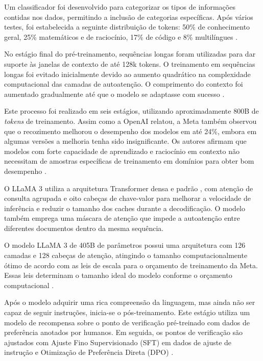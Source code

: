 Um classificador foi desenvolvido para categorizar os tipos de informações contidas nos dados, permitindo a inclusão de categorias específicas. Após vários testes, foi estabelecida a seguinte distribuição de tokens: 50\% de conhecimento geral, 25\% matemáticos e de raciocínio, 17\% de código e 8\% multilíngues \cite{llama3}.

No estágio final do pré-treinamento, sequências longas foram utilizadas para dar suporte às janelas de contexto de até 128k tokens. O treinamento em sequências longas foi evitado inicialmente devido ao aumento quadrático na complexidade computacional das camadas de autoatenção. O comprimento do contexto foi aumentado gradualmente até que o modelo se adaptasse com sucesso \cite{llama3}.

Este processo foi realizado em seis estágios, utilizando aproximadamente 800B de \textit{tokens} de treinamento. Assim como a OpenAI relatou, a Meta também observou que o recozimento melhorou o desempenho dos modelos em até 24\%, embora em algumas versões a melhoria tenha sido insignificante. Os autores afirmam que modelos com forte capacidade de aprendizado e raciocínio em contexto não necessitam de amostras específicas de treinamento em domínios para obter bom desempenho \cite{llama3}.

O LLaMA 3 utiliza a arquitetura Transformer densa e padrão \cite{vaswani2017}, com atenção de consulta agrupada \cite{ainslie2023} e oito cabeças de chave-valor para melhorar a velocidade de inferência e reduzir o tamanho dos caches durante a decodificação. O modelo também emprega uma máscara de atenção que impede a autoatenção entre diferentes documentos dentro da mesma sequência.

O modelo LLaMA 3 de 405B de parâmetros possui uma arquitetura com 126 camadas e 128 cabeças de atenção, atingindo o tamanho computacionalmente ótimo de acordo com as leis de escala para o orçamento de treinamento da Meta. Essas leis determinam o tamanho ideal do modelo conforme o orçamento computacional \cite{llama3}.

Após o modelo adquirir uma rica compreensão da linguagem, mas ainda não ser capaz de seguir instruções, inicia-se o pós-treinamento. Este estágio utiliza um modelo de recompensa sobre o ponto de verificação pré-treinado com dados de preferência anotados por humanos. Em seguida, os pontos de verificação são ajustados com Ajuste Fino Supervisionado (SFT) em dados de ajuste de instrução e Otimização de Preferência Direta (DPO) \cite{llama3}.

